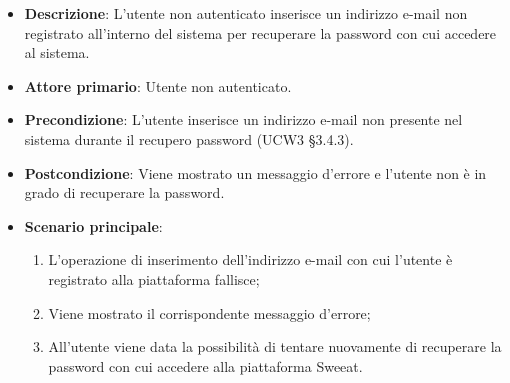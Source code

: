 \begin{itemize}
\item \textbf{Descrizione}: L'utente non autenticato inserisce un indirizzo e-mail non registrato all'interno del sistema per recuperare la password con cui accedere al sistema.
\item \textbf{Attore primario}: Utente non autenticato.
\item \textbf{Precondizione}: L'utente inserisce un indirizzo e-mail non presente nel sistema durante il recupero password (UCW3 §3.4.3).
\item \textbf{Postcondizione}: Viene mostrato un messaggio d'errore e l'utente non è in grado di recuperare la password.

\item \textbf{Scenario principale}:
\begin{enumerate}
\item L'operazione di inserimento dell'indirizzo e-mail con cui l'utente è registrato alla piattaforma fallisce;
\item Viene mostrato il corrispondente messaggio d'errore;
\item All'utente viene data la possibilità di tentare nuovamente di recuperare la password con cui accedere alla piattaforma Sweeat.
\end{enumerate}
\end{itemize}
